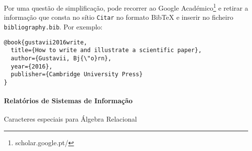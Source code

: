 Por uma questão de simplificação, pode recorrer ao  Google Académico\footnote{scholar.google.pt/} e retirar a informação que consta no sítio \texttt{Citar} no formato BibTeX e inserir no ficheiro \texttt{bibliography.bib}. Por exemplo:
\footnotesize
\begin{verbatim}
@book{gustavii2016write,
  title={How to write and illustrate a scientific paper},
  author={Gustavii, Bj{\"o}rn},
  year={2016},
  publisher={Cambridge University Press}
}
\end{verbatim}

\paragraph{Relatórios de Sistemas de Informação}

Caracteres especiais para Álgebra Relacional


